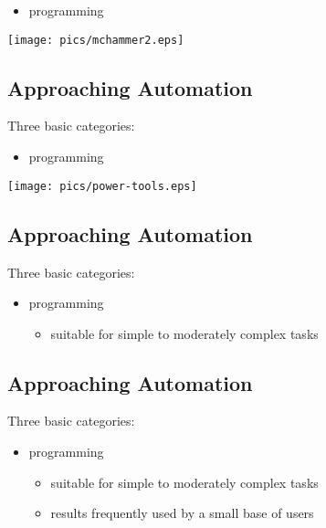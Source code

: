 \documentclass[xga]{xdvislides}
\begin{document}
\begin{itemize}
	\item programming
\end{itemize}
\vspace*{\fill}
\begin{center}
	\texttt{[image: pics/mchammer2.eps]}
\end{center}
\vspace*{\fill}

\subsection{Approaching Automation}
Three basic categories:
\\

\begin{itemize}
	\item programming
\end{itemize}
\vspace*{\fill}
\begin{center}
	\texttt{[image: pics/power-tools.eps]}
\end{center}
\vspace*{\fill}



\subsection{Approaching Automation}
Three basic categories:
\\

\begin{itemize}
	\item programming
		\begin{itemize}
			\item suitable for simple to moderately complex tasks
		\end{itemize}
\end{itemize}

\subsection{Approaching Automation}
Three basic categories:
\\

\begin{itemize}
	\item programming
		\begin{itemize}
			\item suitable for simple to moderately complex tasks
			\item results frequently used by a small base of users
		\end{itemize}
\end{itemize}
\end{document}

